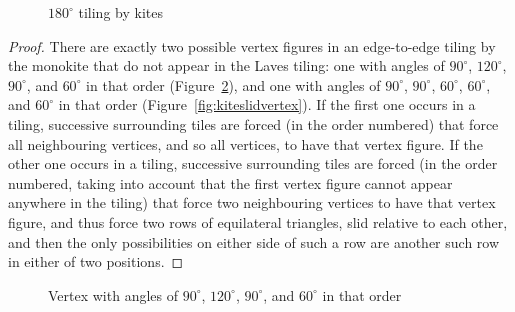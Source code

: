 \begin{figure}[htp!]
\begin{center}
\end{center}
\caption{$180^\circ$ tiling by kites}
\label{fig:kite180tiling}
\end{figure}

\begin{proof}
There are exactly two possible vertex figures in an edge-to-edge
tiling by the monokite that do not appear in the Laves tiling: one
with angles of $90^\circ$, $120^\circ$, $90^\circ$, and $60^\circ$ in
that order (Figure~\ref{fig:kite180vertex}), and one with angles of
$90^\circ$, $90^\circ$, $60^\circ$, $60^\circ$, and $60^\circ$ in that
order (Figure~\ref{fig:kiteslidvertex}).  If the first one occurs in a
tiling, successive surrounding tiles are forced (in the order
numbered) that force all neighbouring vertices, and so all vertices,
to have that vertex figure.  If the other one occurs in a tiling,
successive surrounding tiles are forced (in the order numbered, taking
into account that the first vertex figure cannot appear anywhere in
the tiling) that force two neighbouring vertices to have that vertex
figure, and thus force two rows of equilateral triangles, slid
relative to each other, and then the only possibilities on either side
of such a row are another such row in either of two positions.
\end{proof}

\begin{figure}[htp!]
\begin{center}
\end{center}
\caption{Vertex with angles of $90^\circ$, $120^\circ$, $90^\circ$, and
  $60^\circ$ in that order}
\label{fig:kite180vertex}
\end{figure}

